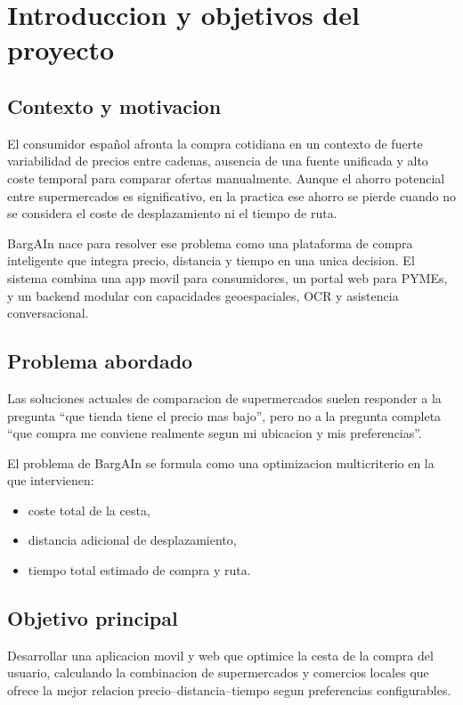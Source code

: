 \chapter{Introduccion y objetivos del proyecto}\label{defobjetivos}

\section{Contexto y motivacion}

El consumidor espa\~nol afronta la compra cotidiana en un contexto de fuerte variabilidad de
precios entre cadenas, ausencia de una fuente unificada y alto coste temporal para comparar
ofertas manualmente. Aunque el ahorro potencial entre supermercados es significativo, en la
practica ese ahorro se pierde cuando no se considera el coste de desplazamiento ni el tiempo de
ruta.

BargAIn nace para resolver ese problema como una plataforma de compra inteligente que integra
precio, distancia y tiempo en una unica decision. El sistema combina una app movil para
consumidores, un portal web para PYMEs, y un backend modular con capacidades geoespaciales,
OCR y asistencia conversacional.

\section{Problema abordado}

Las soluciones actuales de comparacion de supermercados suelen responder a la pregunta
``que tienda tiene el precio mas bajo'', pero no a la pregunta completa ``que compra me conviene
realmente segun mi ubicacion y mis preferencias''.

El problema de BargAIn se formula como una optimizacion multicriterio en la que intervienen:

\begin{itemize}
	\item coste total de la cesta,
	\item distancia adicional de desplazamiento,
	\item tiempo total estimado de compra y ruta.
\end{itemize}

\section{Objetivo principal}

Desarrollar una aplicacion movil y web que optimice la cesta de la compra del usuario,
calculando la combinacion de supermercados y comercios locales que ofrece la mejor relacion
precio--distancia--tiempo segun preferencias configurables.

